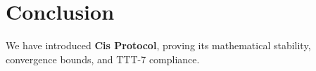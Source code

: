 \section{Conclusion}
We have introduced \textbf{Cis Protocol}, proving its mathematical stability, convergence bounds, and TTT-7 compliance.